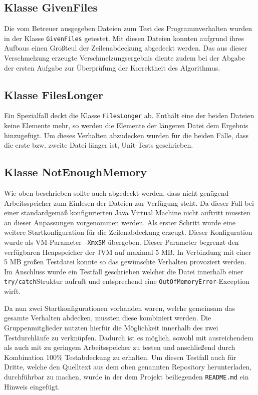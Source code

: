 \documentclass[a4paper,titlepage,12pt]{scrartcl}
\begin{document}
\subsection{Klasse GivenFiles}
\label{sec:givenfiles}
Die vom Betreuer ausgegeben Dateien zum Test des Programmverhalten wurden in der Klasse \texttt{GivenFiles} getestet. Mit diesen Dateien konnten aufgrund ihres Aufbaus einen Großteul der Zeilenabdeckung abgedeckt werden. Das aus dieser Verschmelzung erzeugte Verschmelzungsergebnis diente zudem bei der Abgabe der ersten Aufgabe zur Überprüfung der Korrektheit des Algorithmus.

\subsection{Klasse FilesLonger}
\label{sec:fileslonger}
Ein Spezialfall deckt die Klasse \texttt{FilesLonger} ab. Enthält eine der beiden Dateien keine Elemente mehr, so werden die Elemente der längeren Datei dem Ergebnis hinzugefügt.
Um dieses Verhalten abzudecken wurden für die beiden Fälle, dass die erste bzw. zweite Datei länger ist, Unit-Tests geschrieben.

\subsection{Klasse NotEnoughMemory}
\label{sec:notenoughmemory}
Wie oben beschrieben sollte auch abgedeckt werden, dass nicht genügend Arbeitsspeicher zum Einlesen der Dateien zur Verfügung steht.
Da dieser Fall bei einer standardgemäß konfigurierten Java Virtual Machine nicht auftritt mussten an dieser Anpassungen vorgenommen werden.
Als erster Schritt wurde eine weitere Startkonfiguration für die Zeilenabdeckung erzeugt. Dieser Konfiguration wurde als VM-Parameter \texttt{-Xmx5M} übergeben.
Dieser Parameter begrenzt den verfügbaren Heapspeicher der JVM auf maximal 5 MB. In Verbindung mit einer 5 MB großen Testdatei konnte so das gewünschte Verhalten provoziert werden.
Im Anschluss wurde ein Testfall geschrieben welcher die Datei innerhalb einer \texttt{try/catch}\-Struktur aufruft und entsprechend eine \texttt{OutOfMemoryError}-Exception wirft.

Da nun zwei Startkonfigurationen vorhanden waren, welche gemeinsam das gesamte Verhalten abdecken, mussten diese kombiniert werden.
Die Gruppenmitglieder nutzten hierfür die Möglichkeit innerhalb des \citep{www:ECLEMMA} zwei Testdurchläufe zu verknüpfen.
Dadurch ist es möglich, sowohl mit ausreichendem als auch mit zu geringem Arbeitsspeicher zu testen und anschließend durch Kombination 100\% Testabdeckung zu erhalten.
Um diesen Testfall auch für Dritte, welche den Quelltext aus dem oben genannten Repository herunterladen, durchführbar zu machen, wurde in der dem Projekt beiliegenden \texttt{README.md} ein Hinweis eingefügt.

\clearpage
\appendix



\end{document}
